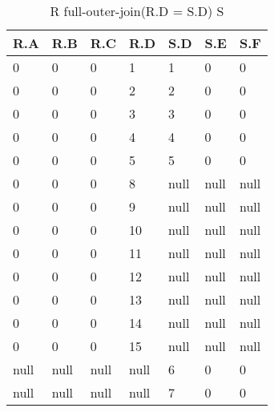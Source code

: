 \documentclass[12pt]{article}
\begin{document}
\begin{enumerate}
\begin{table}[]
	\caption{R full-outer-join(R.D = S.D) S}
	\centering
	\begin{tabular}{|l|l|l|l|l|l|l|}
	\hline
	\textbf{R.A} & \textbf{R.B} & \textbf{R.C} & \textbf{R.D} & \textbf{S.D} & \textbf{S.E} & \textbf{S.F} \\ \hline
	0            & 0            & 0            & 1            & 1            & 0            & 0            \\ \hline
	0            & 0            & 0            & 2            & 2            & 0            & 0            \\ \hline
	0            & 0            & 0            & 3            & 3            & 0            & 0            \\ \hline
	0            & 0            & 0            & 4            & 4            & 0            & 0            \\ \hline
	0            & 0            & 0            & 5            & 5            & 0            & 0            \\ \hline
	0            & 0            & 0            & 8            & null         & null         & null         \\ \hline
	0            & 0            & 0            & 9            & null         & null         & null         \\ \hline
	0            & 0            & 0            & 10           & null         & null         & null         \\ \hline
	0            & 0            & 0            & 11           & null         & null         & null         \\ \hline
	0            & 0            & 0            & 12           & null         & null         & null         \\ \hline
	0            & 0            & 0            & 13           & null         & null         & null         \\ \hline
	0            & 0            & 0            & 14           & null         & null         & null         \\ \hline
	0            & 0            & 0            & 15           & null         & null         & null         \\ \hline
	null         & null         & null         & null         & 6            & 0            & 0            \\ \hline
	null         & null         & null         & null         & 7            & 0            & 0            \\ \hline
	\end{tabular}
	\end{table}



\end{enumerate}
\end{document}
